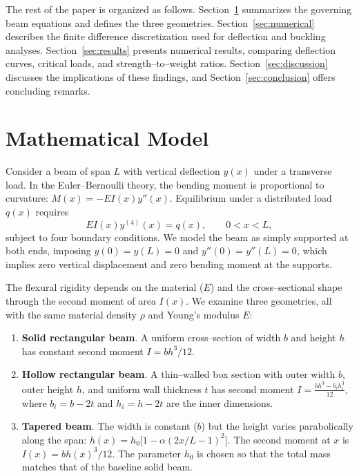 \documentclass[11pt]{article}
\begin{document}
The rest of the paper is organized as follows.  Section~\ref{sec:model}
summarizes the governing beam equations and defines the three geometries.
Section~\ref{sec:numerical} describes the finite difference discretization
used for deflection and buckling analyses.  Section~\ref{sec:results}
presents numerical results, comparing deflection curves, critical loads, and
strength--to--weight ratios.  Section~\ref{sec:discussion} discusses the
implications of these findings, and Section~\ref{sec:conclusion} offers
concluding remarks.

\section{Mathematical Model}
\label{sec:model}

Consider a beam of span $L$ with vertical deflection $y(x)$ under a
transverse load.  In the Euler--Bernoulli theory, the bending moment is
proportional to curvature: $M(x) = -E I(x) y''(x)$.  Equilibrium under a
distributed load $q(x)$ requires
\begin{equation}
E I(x) y^{(4)}(x) = q(x), \qquad 0 < x < L,
\end{equation}
subject to four boundary conditions.  We model the beam as simply supported
at both ends, imposing $y(0)=y(L)=0$ and $y''(0)=y''(L)=0$, which implies
zero vertical displacement and zero bending moment at the supports.

The flexural rigidity depends on the material ($E$) and the cross--sectional
shape through the second moment of area $I(x)$.  We examine three
geometries, all with the same material density $\rho$ and Young's modulus
$E$:

\begin{enumerate}[label=(\roman*)]
    \item \textbf{Solid rectangular beam}. A uniform cross--section of width
        $b$ and height $h$ has constant second moment $I=bh^3/12$.
    \item \textbf{Hollow rectangular beam}.  A thin--walled box section with
        outer width $b$, outer height $h$, and uniform wall thickness $t$ has
        second moment $I = \frac{bh^3 - b_i h_i^3}{12}$, where $b_i=b-2t$
        and $h_i=h-2t$ are the inner dimensions.
    \item \textbf{Tapered beam}.  The width is constant ($b$) but the height
        varies parabolically along the span: $h(x) = h_0\bigl[1 - \alpha(2x/L-1)^2\bigr]$.
        The second moment at $x$ is $I(x) = b h(x)^3/12$.  The parameter $h_0$
        is chosen so that the total mass matches that of the baseline solid
        beam.
\end{enumerate}
\end{document}
